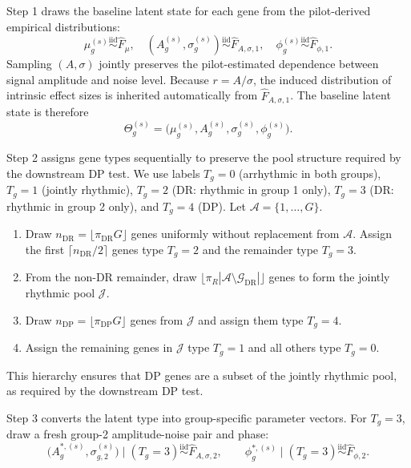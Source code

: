 \documentclass{article}
\begin{document}
Step 1 draws the baseline latent state for each gene from the pilot-derived
empirical distributions:
\begin{equation}
\mu_g^{(s)} \overset{\mathrm{iid}}{\sim}\hat{F}_\mu,\quad
(A_g^{(s)},\sigma_g^{(s)}) \overset{\mathrm{iid}}{\sim}\hat{F}_{A,\sigma,1},\quad
\phi_g^{(s)} \overset{\mathrm{iid}}{\sim}\hat{F}_{\phi,1}.
\label{eq:layer1}
\end{equation}
Sampling $(A,\sigma)$ jointly preserves the pilot-estimated dependence between
signal amplitude and noise level. Because $r=A/\sigma$, the induced
distribution of intrinsic effect sizes is inherited automatically from
$\hat{F}_{A,\sigma,1}$.
The baseline latent state is therefore
\[
\Theta_g^{(s)}=\bigl(\mu_g^{(s)},A_g^{(s)},\sigma_g^{(s)},\phi_g^{(s)}\bigr).
\]

Step 2 assigns gene types sequentially to preserve the pool structure required by
the downstream DP test. We use labels $T_g=0$ (arrhythmic in both groups),
$T_g=1$ (jointly rhythmic), $T_g=2$ (DR: rhythmic in group 1 only),
$T_g=3$ (DR: rhythmic in group 2 only), and $T_g=4$ (DP). Let
$\mathcal{A}=\{1,\ldots,G\}$.

\begin{enumerate}
\item Draw $n_{\mathrm{DR}}=\lfloor\pi_{\mathrm{DR}}G\rfloor$ genes uniformly
without replacement from $\mathcal{A}$. Assign the first
$\lceil n_{\mathrm{DR}}/2\rceil$ genes type $T_g=2$ and the remainder type
$T_g=3$.
\item From the non-DR remainder, draw
$\lfloor\pi_R|\mathcal{A}\setminus\mathcal{G}_{\mathrm{DR}}|\rfloor$
genes to form the jointly rhythmic pool $\mathcal{J}$.
\item Draw $n_{\mathrm{DP}}=\lfloor\pi_{\mathrm{DP}}G\rfloor$ genes from
$\mathcal{J}$ and assign them type
$T_g=4$.
\item Assign the remaining genes in $\mathcal{J}$ type $T_g=1$ and all others
type $T_g=0$.
\end{enumerate}

This hierarchy ensures that DP genes are a subset of the jointly rhythmic pool,
as required by the downstream DP test.

Step 3 converts the latent type into group-specific parameter vectors. For
$T_g=3$, draw a fresh group-2 amplitude-noise pair and phase:
\begin{equation}
\bigl(A_g^{*,(s)},\sigma_{g,2}^{(s)}\bigr) \mid (T_g=3)
\overset{\mathrm{iid}}{\sim}\hat{F}_{A,\sigma,2},
\qquad
\phi_g^{*,(s)} \mid (T_g=3)\overset{\mathrm{iid}}{\sim}\hat{F}_{\phi,2}.
\label{eq:layer3a}
\end{equation}
\end{document}
